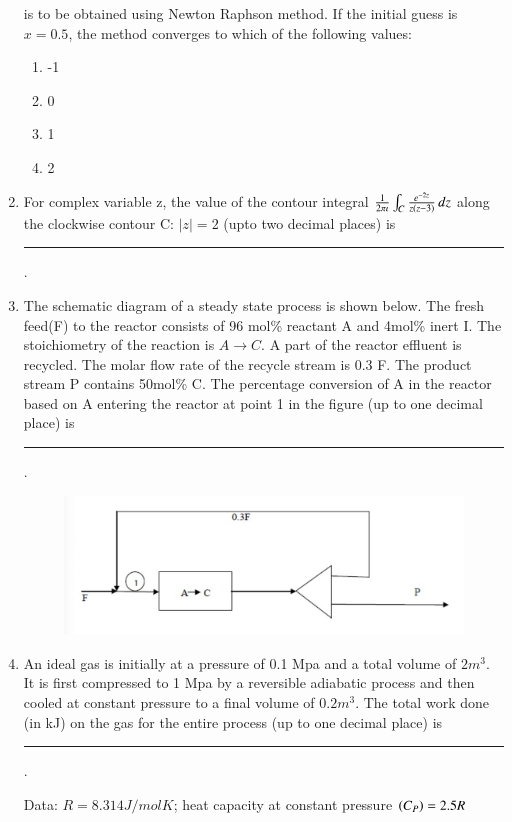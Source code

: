 \documentclass[journal,12pt,onecolumn]{IEEEtran}
\theoremstyle{remark}
\begin{document}
\begin{enumerate}
    is to be obtained using Newton Raphson method. If the initial guess is $x = 0.5$, the method converges to which of the following values:

\hfill{}
\begin{enumerate}
    \item -1
    \item 0
    \item 1
    \item 2
\end{enumerate}

    \item For complex variable z, the value of the contour integral $\frac{1}{2\pi \iota} \int_{C} \frac{e^{-2z}}{z\left(z-3\right)} \, dz$ along the clockwise contour C: $|z| = 2$ (upto two decimal places) is \rule{40pt}{0.1mm}.

\hfill{}
    \item The schematic diagram of a steady state process is shown below. The fresh feed(F) to the reactor consists of 96 mol\% reactant A and 4mol\% inert I. The stoichiometry of the reaction is $A \to C$. A part of the reactor effluent is recycled. The molar flow rate of the recycle stream is 0.3 F. The product stream P contains 50mol\% C. The percentage conversion of A in the reactor based on A entering the reactor at point 1  in the figure (up to one decimal place) is \rule{40pt}{0.1mm}.

\hfill{}
    \begin{figure}[H]
        \centering
        \includegraphics[width=0.5\columnwidth]{figs/40.png}
        \caption{}
        \label{fig:40}
    \end{figure}

    \item An ideal gas is initially at a pressure of 0.1 Mpa and a total volume of $2m^3$. It is first compressed to 1 Mpa by a reversible adiabatic process and then cooled at constant pressure to a final volume of $0.2m^3$. The total work done (in kJ) on the gas for the entire process (up to one decimal place) is \rule{40pt}{0.1mm}.

    Data: $R=8.314J/molK$; heat capacity at constant pressure $\left(C_P\right) = 2.5R$


\end{enumerate}
\end{document}
